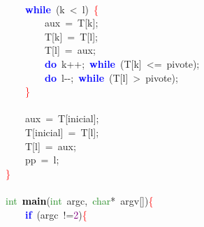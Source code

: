 \mbox{}\ \ \ \  \\
\mbox{}\ \ \ \ \textbf{\textcolor{Blue}{while}}\ \textcolor{BrickRed}{(}k\ \textcolor{BrickRed}{\textless{}}\ l\textcolor{BrickRed}{)}\ \textcolor{Red}{\{} \\
\mbox{}\ \ \ \ \ \ \ \ aux\ \textcolor{BrickRed}{=}\ T\textcolor{BrickRed}{[}k\textcolor{BrickRed}{];} \\
\mbox{}\ \ \ \ \ \ \ \ T\textcolor{BrickRed}{[}k\textcolor{BrickRed}{]}\ \textcolor{BrickRed}{=}\ T\textcolor{BrickRed}{[}l\textcolor{BrickRed}{];} \\
\mbox{}\ \ \ \ \ \ \ \ T\textcolor{BrickRed}{[}l\textcolor{BrickRed}{]}\ \textcolor{BrickRed}{=}\ aux\textcolor{BrickRed}{;} \\
\mbox{}\ \ \ \ \ \ \ \ \textbf{\textcolor{Blue}{do}}\ k\textcolor{BrickRed}{++;}\ \textbf{\textcolor{Blue}{while}}\ \textcolor{BrickRed}{(}T\textcolor{BrickRed}{[}k\textcolor{BrickRed}{]}\ \textcolor{BrickRed}{\textless{}=}\ pivote\textcolor{BrickRed}{);} \\
\mbox{}\ \ \ \ \ \ \ \ \textbf{\textcolor{Blue}{do}}\ l\textcolor{BrickRed}{-\/-;}\ \textbf{\textcolor{Blue}{while}}\ \textcolor{BrickRed}{(}T\textcolor{BrickRed}{[}l\textcolor{BrickRed}{]}\ \textcolor{BrickRed}{\textgreater{}}\ pivote\textcolor{BrickRed}{);} \\
\mbox{}\ \ \ \ \textcolor{Red}{\}} \\
\mbox{} \\
\mbox{}\ \ \ \ aux\ \textcolor{BrickRed}{=}\ T\textcolor{BrickRed}{[}inicial\textcolor{BrickRed}{];} \\
\mbox{}\ \ \ \ T\textcolor{BrickRed}{[}inicial\textcolor{BrickRed}{]}\ \textcolor{BrickRed}{=}\ T\textcolor{BrickRed}{[}l\textcolor{BrickRed}{];} \\
\mbox{}\ \ \ \ T\textcolor{BrickRed}{[}l\textcolor{BrickRed}{]}\ \textcolor{BrickRed}{=}\ aux\textcolor{BrickRed}{;} \\
\mbox{}\ \ \ \ pp\ \textcolor{BrickRed}{=}\ l\textcolor{BrickRed}{;} \\
\mbox{}\textcolor{Red}{\}} \\
\mbox{} \\
\mbox{}\textcolor{ForestGreen}{int}\ \textbf{\textcolor{Black}{main}}\textcolor{BrickRed}{(}\textcolor{ForestGreen}{int}\ argc\textcolor{BrickRed}{,}\ \textcolor{ForestGreen}{char}\textcolor{BrickRed}{*}\ argv\textcolor{BrickRed}{[])}\textcolor{Red}{\{} \\
\mbox{}\ \ \ \ \textbf{\textcolor{Blue}{if}}\ \textcolor{BrickRed}{(}argc\ \textcolor{BrickRed}{!=}\textcolor{Purple}{2}\textcolor{BrickRed}{)}\textcolor{Red}{\{} \\
